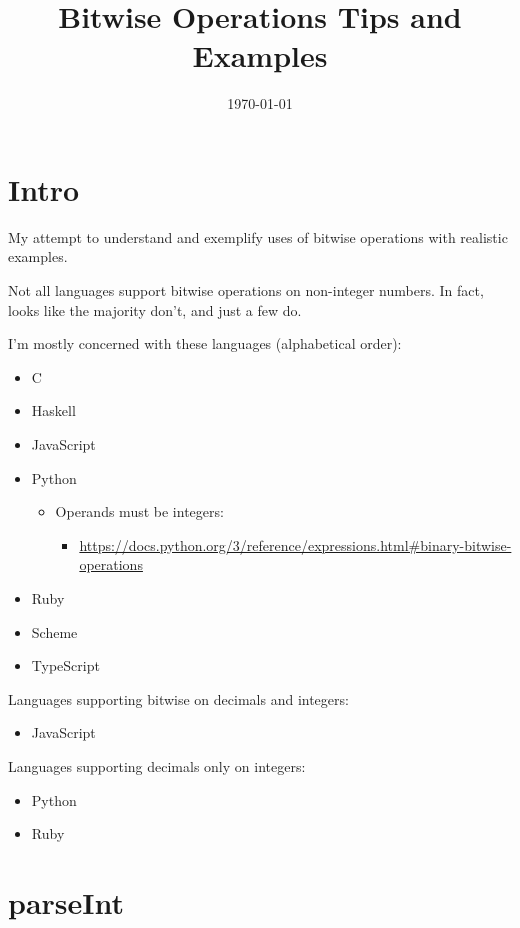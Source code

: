 \documentclass[11pt]{article}
\date{\today}
\title{Bitwise Operations Tips and Examples}
\begin{document}
\maketitle
\tableofcontents


\section{Intro}
\label{sec:orgf7b3691}

My attempt to understand and exemplify uses of bitwise operations with realistic examples.

Not all languages support bitwise operations on non-integer numbers. In fact, looks like the majority don't, and just a few do.

I'm mostly concerned with these languages (alphabetical order):

\begin{itemize}
\item C
\item Haskell
\item JavaScript
\item Python
\begin{itemize}
\item Operands must be integers:
\begin{itemize}
\item \url{https://docs.python.org/3/reference/expressions.html\#binary-bitwise-operations}
\end{itemize}
\end{itemize}
\item Ruby
\item Scheme
\item TypeScript
\end{itemize}

Languages supporting bitwise on decimals and integers:

\begin{itemize}
\item JavaScript
\end{itemize}

Languages supporting decimals only on integers:

\begin{itemize}
\item Python
\item Ruby
\end{itemize}

\section{parseInt}
\label{sec:org5ba1d5b}
\end{document}
